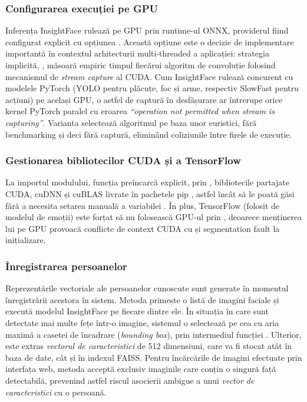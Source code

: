 \documentclass[../../main.tex]{subfiles}
\begin{document}
\subsubsection{Configurarea execuției pe GPU}
Inferența InsightFace rulează pe GPU prin runtime-ul ONNX, providerul \linebreak {} fiind configurat explicit cu opțiunea   . Această opțiune este o decizie de implementare importantă în contextul arhitecturii multi-threaded a aplicației: strategia implicită, , măsoară empiric timpul fiecărui
algoritm de convoluție folosind mecanismul de \textit{stream capture} al CUDA. Cum
InsightFace rulează concurent cu modelele PyTorch (YOLO pentru plăcuțe, foc și arme,
respectiv SlowFast pentru acțiuni) pe același GPU, o astfel de captură în desfășurare
ar întrerupe orice kernel PyTorch paralel cu eroarea \textit{``operation not permitted
when stream is capturing''}. Varianta  selectează algoritmul pe
baza unor euristici, fără benchmarking și deci fără captură, eliminând coliziunile
între firele de execuție.

\subsubsection{Gestionarea bibliotecilor CUDA și a TensorFlow}
La importul modulului, funcția  preîncarcă explicit, prin , bibliotecile partajate CUDA, cuDNN și cuBLAS livrate în pachetele pip , astfel încât \linebreak {} să le poată găsi fără a necesita setarea manuală a variabilei  . În plus, TensorFlow (folosit de modelul de emoții) este forțat să nu folosească GPU-ul prin , deoarece menținerea lui pe GPU provoacă conflicte de context CUDA cu   și segmentation fault la inițializare.

\subsubsection{Înregistrarea persoanelor}
Reprezentările vectoriale ale persoanelor cunoscute sunt generate în momentul înregistrării acestora în sistem. Metoda  primește o listă de imagini faciale și execută modelul InsightFace pe fiecare dintre ele. În situația în care sunt detectate mai multe fețe într-o imagine, sistemul o selectează pe cea cu aria maximă a casetei de încadrare (\emph{bounding box}), prin intermediul funcției . Ulterior, este extras \emph{vectorul de caracteristici} de 512 dimensiuni, care va fi stocat atât în baza de date, cât și în indexul FAISS. Pentru încărcările de imagini efectuate prin interfața web, metoda   acceptă exclusiv imaginile care conțin o singură față detectabilă, prevenind astfel riscul asocierii ambigue a unui \emph{vector de caracteristici} cu o persoană.
\end{document}
